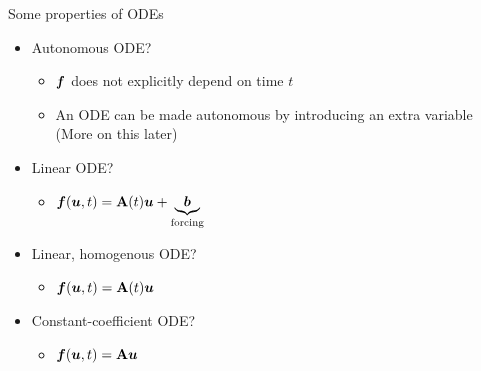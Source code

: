 \documentclass[presentation]{beamer}
\newcommand{\gv}[1]{\ensuremath{\mbox{\boldmath$ #1 $}}}
\newcommand{\bv}[1]{\ensuremath{\mathbf{#1}}}
\begin{document}
\begin{frame}[label={sec:orgc9c677b}]{Some properties of ODEs}
\begin{itemize}
\item \alert{Autonomous} ODE?
\begin{itemize}
\item \(\gv{f}\) does not explicitly depend on time \(t\)
\item An ODE can be made autonomous by introducing an extra variable (More on
this later)
\end{itemize}
\item \alert{Linear} ODE?
\begin{itemize}
\item \(\gv{f}(\gv{u}, t) =  \bv{A}(t)\gv{u} + \underbrace{\gv{b}}_{\text{forcing}}\)
\end{itemize}
\item \alert{Linear, homogenous} ODE?
\begin{itemize}
\item \(\gv{f}(\gv{u}, t) =  \bv{A}(t)\gv{u}\)
\end{itemize}
\item \alert{Constant-coefficient} ODE?
\begin{itemize}
\item \(\gv{f}(\gv{u}, t) =  \bv{A}\gv{u}\)
\end{itemize}
\end{itemize}
\end{frame}
\end{document}
